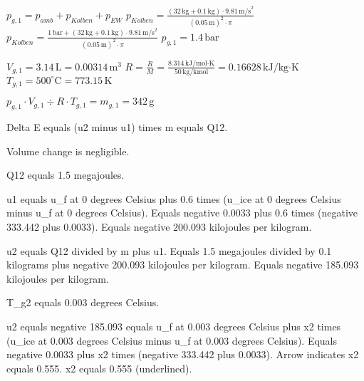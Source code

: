 \( p_{g,1} = p_{amb} + p_{Kolben} + p_{EW} \)  
\( p_{Kolben} = \frac{(32 \, \text{kg} + 0.1 \, \text{kg}) \cdot 9.81 \, \text{m/s}^2}{(0.05 \, \text{m})^2 \cdot \pi} \)  
\( p_{Kolben} = \frac{1 \, \text{bar} + (32 \, \text{kg} + 0.1 \, \text{kg}) \cdot 9.81 \, \text{m/s}^2}{(0.05 \, \text{m})^2 \cdot \pi} \)  
\( p_{g,1} = 1.4 \, \text{bar} \)  

\( V_{g,1} = 3.14 \, \text{L} = 0.00314 \, \text{m}^3 \)  
\( R = \frac{R}{M} = \frac{8.314 \, \text{kJ/mol·K}}{50 \, \text{kg/kmol}} = 0.16628 \, \text{kJ/kg·K} \)  
\( T_{g,1} = 500^\circ \text{C} = 773.15 \, \text{K} \)  

\( p_{g,1} \cdot V_{g,1} \div R \cdot T_{g,1} = m_{g,1} = 342 \, \text{g} \)

Delta E equals (u2 minus u1) times m equals Q12.  

Volume change is negligible.  

Q12 equals 1.5 megajoules.  

u1 equals u_f at 0 degrees Celsius plus 0.6 times (u_ice at 0 degrees Celsius minus u_f at 0 degrees Celsius).  
Equals negative 0.0033 plus 0.6 times (negative 333.442 plus 0.0033).  
Equals negative 200.093 kilojoules per kilogram.  

u2 equals Q12 divided by m plus u1.  
Equals 1.5 megajoules divided by 0.1 kilograms plus negative 200.093 kilojoules per kilogram.  
Equals negative 185.093 kilojoules per kilogram.  

T_g2 equals 0.003 degrees Celsius.  

u2 equals negative 185.093 equals u_f at 0.003 degrees Celsius plus x2 times (u_ice at 0.003 degrees Celsius minus u_f at 0.003 degrees Celsius).  
Equals negative 0.0033 plus x2 times (negative 333.442 plus 0.0033).  
Arrow indicates x2 equals 0.555.  
x2 equals 0.555 (underlined).